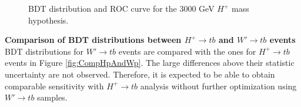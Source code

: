 \begin{description}
    \begin{figure}[H]
      \centering
      \caption{BDT distribution and ROC curve for the 3000 GeV $H^{+}$ mass hypothesis.}
      \label{fig:BDTTrainingResults_Hp3000}
    \end{figure}

    \item{\textbf{Comparison of BDT distributions between $H^{+} \rightarrow tb$ and  $W' \rightarrow tb$ events}}\mbox{}\\
    BDT distributions for $W' \rightarrow tb$ events are compared with the ones for $H^{+} \rightarrow tb$ events in Figure \ref{fig:CompHpAndWp}. The large differences above their statistic uncertainty are not observed. Therefore, it is expected to be able to obtain comparable sensitivity with $H^{+} \rightarrow tb$ analysis without further optimization using $W' \rightarrow tb$ samples.


\end{description}
